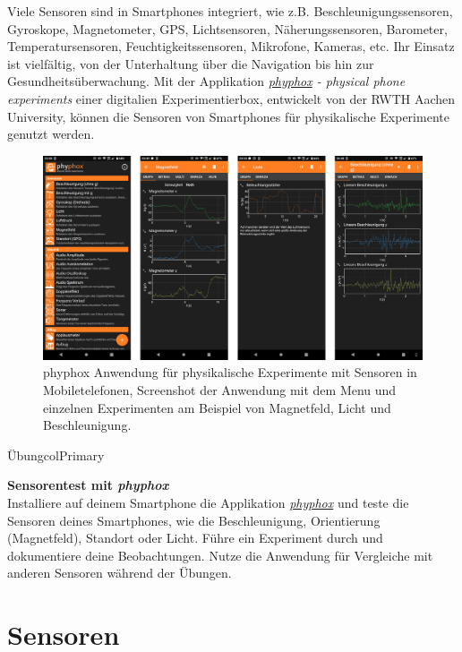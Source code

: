 \documentclass[
  11pt,
  a4paperpaper,
  oneside, openany  ,captions=tableheading
]{scrbook}
\theoremstyle{definition}
\theoremstyle{remark}
\begin{document}
Viele Sensoren sind in Smartphones integriert, wie z.B.
Beschleunigungssensoren, Gyroskope, Magnetometer, GPS, Lichtsensoren,
Näherungssensoren, Barometer, Temperatursensoren, Feuchtigkeitssensoren,
Mikrofone, Kameras, etc. Ihr Einsatz ist vielfältig, von der
Unterhaltung über die Navigation bis hin zur Gesundheitsüberwachung. Mit
der Applikation \emph{\href{https://phyphox.org}{phyphox}
- physical phone experiments} einer digitalien Experimentierbox,
entwickelt von der RWTH Aachen University, können die Sensoren von
Smartphones für physikalische Experimente genutzt werden.

\begin{figure}[H]

{\centering \includegraphics{images/phyphox.png}

}

\caption{phyphox Anwendung für physikalische Experimente mit Sensoren in
Mobiletelefonen, Screenshot der Anwendung mit dem Menu und einzelnen
Experimenten am Beispiel von Magnetfeld, Licht und Beschleunigung.}

\end{figure}%

\begin{boxtitle}{Übung}{colPrimary}

\textbf{Sensorentest mit \emph{phyphox}}\\
Installiere auf deinem Smartphone die Applikation
\emph{\href{https://phyphox.org}{phyphox}} und teste die Sensoren deines
Smartphones, wie die Beschleunigung, Orientierung (Magnetfeld), Standort
oder Licht. Führe ein Experiment durch und dokumentiere deine
Beobachtungen. Nutze die Anwendung für Vergleiche mit anderen Sensoren
während der Übungen.

\end{boxtitle}

\section{Sensoren}\label{sensoren-1}
\end{document}
